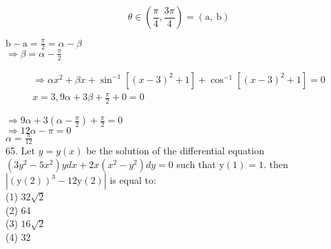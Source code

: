 \documentclass[10pt]{article}
\begin{document}
\[
\theta \in\left(\frac{\pi}{4}, \frac{3 \pi}{4}\right)=(\mathrm{a}, \mathrm{~b})
\]

\(\mathrm{b}-\mathrm{a}=\frac{\pi}{2}=\alpha-\beta\)\\
\(\Rightarrow \beta=\alpha-\frac{\pi}{2}\)

\[
\begin{gathered}
\Rightarrow \alpha x^{2}+\beta x+\sin ^{-1}\left[(x-3)^{2}+1\right]+\cos ^{-1}\left[(x-3)^{2}+1\right]=0 \\
x=3,9 \alpha+3 \beta+\frac{\pi}{2}+0=0
\end{gathered}
\]

\(\Rightarrow 9 \alpha+3\left(\alpha-\frac{\pi}{2}\right)+\frac{\pi}{2}=0\)\\
\(\Rightarrow 12 \alpha-\pi=0\)\\
\(\alpha=\frac{\pi}{12}\)\\
65. Let \(y=y(x)\) be the solution of the differential equation\\
\(\left(3 y^{2}-5 x^{2}\right) y d x+2 x\left(x^{2}-y^{2}\right) d y=0\) such that \(\mathrm{y}(1)=1\). then \(\left|(\mathrm{y}(2))^{3}-12 \mathrm{y}(2)\right|\) is equal to:\\
(1) \(32 \sqrt{2}\)\\
(2) 64\\
(3) \(16 \sqrt{2}\)\\
(4) 32
\end{document}
